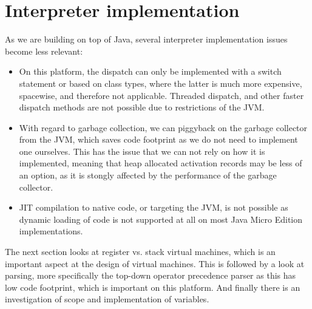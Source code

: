 \documentclass[11pt]{report}
\begin{document}
\section{Interpreter implementation}
\label{interpreter-implementation}

As we are building on top of Java, 
several interpreter implementation issues
become less relevant:
\begin{itemize}
\item On this platform, the dispatch can only be implemented 
with a switch statement or based on class types, where the
latter is much more expensive, spacewise, and therefore not applicable.
Threaded dispatch, and other faster dispatch methods are not possible
due to restrictions of the JVM.
\item With regard to garbage collection, we can piggyback on the garbage collector from the JVM, which saves code footprint as we do not need to implement one ourselves. This has the issue that we can not rely on how it is implemented, meaning that heap allocated activation records may be less of an option, as it is stongly affected by the performance of the garbage collector.
\item JIT compilation to native code, or targeting the JVM, is not possible as dynamic loading of code is not supported at all on most Java Micro Edition implementations.
\end{itemize}

The next section looks at register vs. stack virtual machines, which is an important aspect at the design of virtual machines. This is followed by a look at parsing, more specifically the top-down operator precedence parser as this has low code footprint, which is important on this platform. And finally there is an investigation of scope and implementation of variables.


\end{document}
